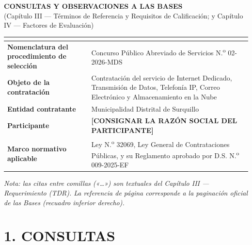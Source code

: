 \documentclass[10pt]{article}
\renewcommand{\arraystretch}{1.15}
\begin{document}
\begin{center}
  {\Large\bfseries CONSULTAS Y OBSERVACIONES A LAS BASES}\\[2pt]
  {\large (Capítulo III — Términos de Referencia y Requisitos de Calificación; y Capítulo IV — Factores de Evaluación)}\\[10pt]
\end{center}

\noindent\renewcommand{\arraystretch}{1.3}
\begin{tabular}{|>{\bfseries}p{6.0cm}|p{18.5cm}|}
\hline
\rowcolor{filagris}\multicolumn{2}{|l|}{\bfseries Formato para Formular Consultas y Observaciones}\\\hline
Nomenclatura del procedimiento de selección & Concurso Público Abreviado de Servicios N.\textsuperscript{o} 02-2026-MDS \\\hline
Objeto de la contratación & Contratación del servicio de Internet Dedicado, Transmisión de Datos, Telefonía IP, Correo Electrónico y Almacenamiento en la Nube \\\hline
Entidad contratante & Municipalidad Distrital de Surquillo \\\hline
Participante & \textbf{[CONSIGNAR LA RAZÓN SOCIAL DEL PARTICIPANTE]} \\\hline
Marco normativo aplicable & Ley N.\textsuperscript{o} 32069, Ley General de Contrataciones Públicas, y su Reglamento aprobado por D.S. N.\textsuperscript{o} 009-2025-EF \\\hline
\end{tabular}

\vspace{6pt}
\noindent\footnotesize\textit{Nota: las citas entre comillas («\ldots») son textuales del Capítulo III — Requerimiento (TDR). La referencia de página corresponde a la paginación oficial de las Bases (recuadro inferior derecho).}
\normalsize

\section*{1. CONSULTAS}
\end{document}
